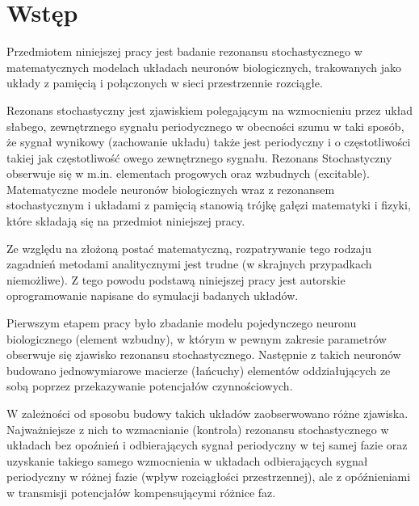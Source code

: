 \section{Wstęp}

Przedmiotem niniejszej pracy jest badanie rezonansu stochastycznego w matematycznych modelach układach neuronów biologicznych, trakowanych jako układy z pamięcią i połączonych w sieci przestrzennie rozciągłe.

Rezonans stochastyczny jest zjawiskiem polegającym na wzmocnieniu przez układ słabego, zewnętrznego sygnału periodycznego w obecności szumu w taki sposób, że sygnał wynikowy (zachowanie układu) także jest periodyczny i o częstotliwości takiej jak częstotliwość owego zewnętrznego sygnału. Rezonans Stochastyczny obserwuje się w m.in. elementach progowych oraz wzbudnych (excitable). Matematyczne modele neuronów biologicznych wraz z rezonansem stochastycznym i układami z pamięcią stanowią trójkę gałęzi matematyki i fizyki, które składają się na przedmiot niniejszej pracy.

Ze względu na złożoną postać matematyczną, rozpatrywanie tego rodzaju zagadnień metodami analitycznymi jest trudne (w skrajnych przypadkach niemożliwe). Z tego powodu podstawą niniejszej pracy jest autorskie oprogramowanie napisane do symulacji badanych układów.

Pierwszym etapem pracy było zbadanie modelu pojedynczego neuronu biologicznego (element wzbudny), w którym w pewnym zakresie parametrów obserwuje się zjawisko rezonansu stochastycznego. Następnie z takich neuronów budowano jednowymiarowe macierze (łańcuchy) elementów oddziałujących ze sobą poprzez przekazywanie potencjałów czynnościowych.

W zależności od sposobu budowy takich układów zaobserwowano różne zjawiska. Najważniejsze z nich to wzmacnianie (kontrola) rezonansu stochastycznego w układach bez opoźnień i odbierających sygnał periodyczny w tej samej fazie oraz uzyskanie takiego samego wzmocnienia w układach odbierających sygnał periodyczny w różnej fazie (wpływ rozciągłości przestrzennej), ale z opóźnieniami w transmisji potencjałów kompensującymi różnice faz.